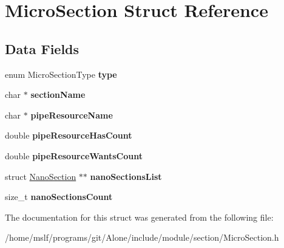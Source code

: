 \hypertarget{struct_micro_section}{}\section{Micro\+Section Struct Reference}
\label{struct_micro_section}
\subsection*{Data Fields}
\begin{DoxyCompactItemize}
\item 
\hypertarget{struct_micro_section_a523f9c053238202870aa7fcd00c890da}{}\label{struct_micro_section_a523f9c053238202870aa7fcd00c890da} 
enum Micro\+Section\+Type {\bfseries type}
\item 
\hypertarget{struct_micro_section_a7dadb8f2b7c0ffb34931b35b5af02e99}{}\label{struct_micro_section_a7dadb8f2b7c0ffb34931b35b5af02e99} 
char $\ast$ {\bfseries section\+Name}
\item 
\hypertarget{struct_micro_section_afa0c147f49333d1226a02e55d9bc6f94}{}\label{struct_micro_section_afa0c147f49333d1226a02e55d9bc6f94} 
char $\ast$ {\bfseries pipe\+Resource\+Name}
\item 
\hypertarget{struct_micro_section_a9e7d714df3ba5642dbc719419fd16192}{}\label{struct_micro_section_a9e7d714df3ba5642dbc719419fd16192} 
double {\bfseries pipe\+Resource\+Has\+Count}
\item 
\hypertarget{struct_micro_section_a18edf5cca337ced295e9bf6bdc904cda}{}\label{struct_micro_section_a18edf5cca337ced295e9bf6bdc904cda} 
double {\bfseries pipe\+Resource\+Wants\+Count}
\item 
\hypertarget{struct_micro_section_aec63f87f8d4f3afbfdb13d8f6ad16a9b}{}\label{struct_micro_section_aec63f87f8d4f3afbfdb13d8f6ad16a9b} 
struct \hyperlink{struct_nano_section}{Nano\+Section} $\ast$$\ast$ {\bfseries nano\+Sections\+List}
\item 
\hypertarget{struct_micro_section_a380eb53156231f54370b67b8327f0eff}{}\label{struct_micro_section_a380eb53156231f54370b67b8327f0eff} 
size\+\_\+t {\bfseries nano\+Sections\+Count}
\end{DoxyCompactItemize}


The documentation for this struct was generated from the following file\+:\begin{DoxyCompactItemize}
\item 
/home/mslf/programs/git/\+Alone/include/module/section/Micro\+Section.\+h\end{DoxyCompactItemize}
